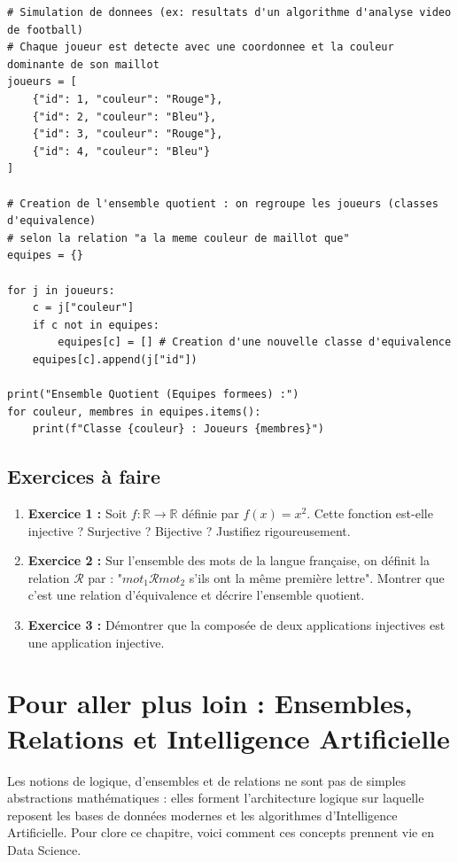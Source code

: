 \documentclass[12pt,a4paper]{report}
\begin{document}
\begin{lstlisting}
# Simulation de donnees (ex: resultats d'un algorithme d'analyse video de football)
# Chaque joueur est detecte avec une coordonnee et la couleur dominante de son maillot
joueurs = [
    {"id": 1, "couleur": "Rouge"},
    {"id": 2, "couleur": "Bleu"},
    {"id": 3, "couleur": "Rouge"},
    {"id": 4, "couleur": "Bleu"}
]

# Creation de l'ensemble quotient : on regroupe les joueurs (classes d'equivalence) 
# selon la relation "a la meme couleur de maillot que"
equipes = {}

for j in joueurs:
    c = j["couleur"]
    if c not in equipes:
        equipes[c] = [] # Creation d'une nouvelle classe d'equivalence
    equipes[c].append(j["id"])

print("Ensemble Quotient (Equipes formees) :")
for couleur, membres in equipes.items():
    print(f"Classe {couleur} : Joueurs {membres}")
\end{lstlisting}

\subsection{Exercices à faire}
\begin{enumerate}
    \item \textbf{Exercice 1 :} Soit $f : \mathbb{R} \to \mathbb{R}$ définie par $f(x) = x^2$. Cette fonction est-elle injective ? Surjective ? Bijective ? Justifiez rigoureusement.
    \item \textbf{Exercice 2 :} Sur l'ensemble des mots de la langue française, on définit la relation $\mathcal{R}$ par : "$mot_1 \mathcal{R} mot_2$ s'ils ont la même première lettre". Montrer que c'est une relation d'équivalence et décrire l'ensemble quotient.
    \item \textbf{Exercice 3 :} Démontrer que la composée de deux applications injectives est une application injective.
\end{enumerate}

\section*{Pour aller plus loin : Ensembles, Relations et Intelligence Artificielle}

Les notions de logique, d'ensembles et de relations ne sont pas de simples abstractions mathématiques : elles forment l'architecture logique sur laquelle reposent les bases de données modernes et les algorithmes d'Intelligence Artificielle. Pour clore ce chapitre, voici comment ces concepts prennent vie en Data Science.
\end{document}
